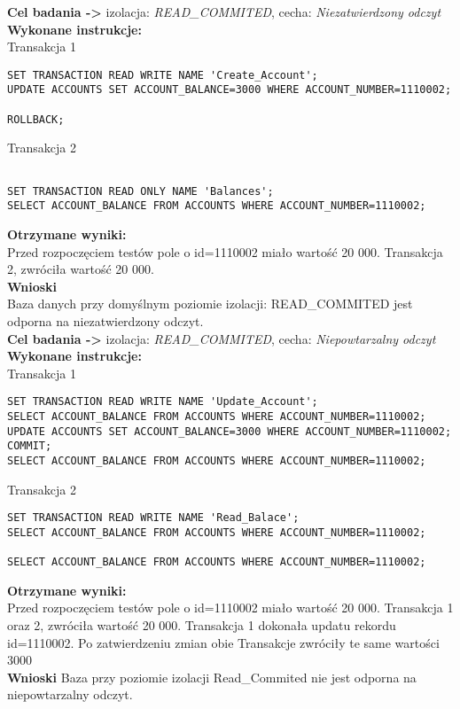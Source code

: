 \documentclass[11pt,oneside, a4paper]{article}
\title{}
\date{}
\begin{document}
\justify
\textbf{Cel badania ->} izolacja:
\textit{READ\_COMMITED}, cecha:
\textit{Niezatwierdzony odczyt} \\
\textbf{Wykonane instrukcje: } \\
Transakcja 1
\begin{lstlisting}
SET TRANSACTION READ WRITE NAME 'Create_Account';
UPDATE ACCOUNTS SET ACCOUNT_BALANCE=3000 WHERE ACCOUNT_NUMBER=1110002;

ROLLBACK;
\end{lstlisting}
Transakcja 2
\begin{lstlisting}

SET TRANSACTION READ ONLY NAME 'Balances';
SELECT ACCOUNT_BALANCE FROM ACCOUNTS WHERE ACCOUNT_NUMBER=1110002;
\end{lstlisting}
\textbf{Otrzymane wyniki:} \\
    Przed rozpoczęciem testów pole o id=1110002 miało wartość 20 000. Transakcja 2, zwróciła  wartość 20 000.\\
\textbf{Wnioski} \\
    Baza danych przy domyślnym poziomie izolacji: READ\_COMMITED jest odporna na niezatwierdzony odczyt. \\
\textbf{Cel badania ->} izolacja:
\textit{READ\_COMMITED}, cecha:
\textit{Niepowtarzalny odczyt} \\
\textbf{Wykonane instrukcje: } \\
Transakcja 1
\begin{lstlisting}
SET TRANSACTION READ WRITE NAME 'Update_Account';
SELECT ACCOUNT_BALANCE FROM ACCOUNTS WHERE ACCOUNT_NUMBER=1110002;
UPDATE ACCOUNTS SET ACCOUNT_BALANCE=3000 WHERE ACCOUNT_NUMBER=1110002;
COMMIT;
SELECT ACCOUNT_BALANCE FROM ACCOUNTS WHERE ACCOUNT_NUMBER=1110002;
\end{lstlisting}
Transakcja 2
\begin{lstlisting}
SET TRANSACTION READ WRITE NAME 'Read_Balace';
SELECT ACCOUNT_BALANCE FROM ACCOUNTS WHERE ACCOUNT_NUMBER=1110002;

SELECT ACCOUNT_BALANCE FROM ACCOUNTS WHERE ACCOUNT_NUMBER=1110002;
\end{lstlisting}
\textbf{Otrzymane wyniki:} \\
    Przed rozpoczęciem testów pole o id=1110002 miało wartość 20 000. Transakcja 1 oraz 2, zwróciła  wartość 20 000. Transakcja 1 dokonała updatu rekordu id=1110002. Po zatwierdzeniu zmian obie Transakcje zwróciły te same wartości 3000\\
\textbf{Wnioski } Baza przy poziomie izolacji Read\_Commited nie jest odporna na niepowtarzalny odczyt.\\
\end{document}
